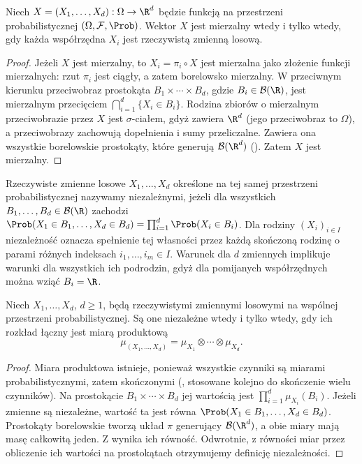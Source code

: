 \begin{stwierdzenie}
Niech $X=(X_1,\ldots,X_d):\Omega\to\R^d$ będzie funkcją
na przestrzeni probabilistycznej $(\Omega,\mathcal F,\Prob)$.
Wektor $X$ jest mierzalny wtedy i tylko wtedy,
gdy każda współrzędna $X_i$ jest rzeczywistą zmienną losową.
\end{stwierdzenie}
\begin{proof}
Jeżeli $X$ jest mierzalny, to $X_i=\pi_i\circ X$ jest mierzalna
jako złożenie funkcji mierzalnych: rzut $\pi_i$ jest ciągły,
a zatem borelowsko mierzalny.
W przeciwnym kierunku przeciwobraz prostokąta
$B_1\times\cdots\times B_d$, gdzie $B_i\in\mathcal B(\R)$,
jest mierzalnym przecięciem $\bigcap_{i=1}^d\{X_i\in B_i\}$.
Rodzina zbiorów o mierzalnym przeciwobrazie przez $X$ jest
$\sigma$-ciałem, gdyż zawiera $\R^d$ (jego przeciwobraz
to $\Omega$), a przeciwobrazy zachowują dopełnienia
i sumy przeliczalne. Zawiera ona wszystkie borelowskie
prostokąty, które generują $\mathcal B(\R^d)$
().
Zatem $X$ jest mierzalny.
\end{proof}

\begin{definicja}
Rzeczywiste zmienne losowe $X_1,\ldots,X_d$ określone na tej
samej przestrzeni probabilistycznej nazywamy niezależnymi,
jeżeli dla wszystkich $B_1,\ldots,B_d\in\mathcal B(\R)$ zachodzi
$\Prob(X_1\in B_1,\ldots,X_d\in B_d)=\prod_{i=1}^d\Prob(X_i\in B_i)$.
Dla rodziny $(X_i)_{i\in I}$ niezależność oznacza spełnienie tej
własności przez każdą skończoną rodzinę o parami różnych
indeksach $i_1,\ldots,i_m\in I$. Warunek dla $d$ zmiennych
implikuje warunki dla wszystkich ich podrodzin, gdyż dla
pomijanych współrzędnych można wziąć $B_i=\R$.
\end{definicja}

\begin{stwierdzenie}
Niech $X_1,\ldots,X_d$, $d\geq1$, będą rzeczywistymi zmiennymi
losowymi na wspólnej przestrzeni probabilistycznej.
Są one niezależne wtedy i tylko wtedy, gdy ich rozkład łączny
jest miarą produktową
\[
\mu_{(X_1,\ldots,X_d)}=\mu_{X_1}\otimes\cdots\otimes\mu_{X_d}.
\]
\end{stwierdzenie}
\begin{proof}
Miara produktowa istnieje, ponieważ wszystkie czynniki są
miarami probabilistycznymi, zatem skończonymi
(,
stosowane kolejno do skończenie wielu czynników).
Na prostokącie $B_1\times\cdots\times B_d$ jej wartością
jest $\prod_{i=1}^d\mu_{X_i}(B_i)$.
Jeżeli zmienne są niezależne, wartość ta jest równa
$\Prob(X_1\in B_1,\ldots,X_d\in B_d)$.
Prostokąty borelowskie tworzą układ $\pi$ generujący
$\mathcal B(\R^d)$, a obie miary mają masę całkowitą jeden.
Z 
wynika ich równość. Odwrotnie, z równości miar przez
obliczenie ich wartości na prostokątach otrzymujemy definicję
niezależności.
\end{proof}

